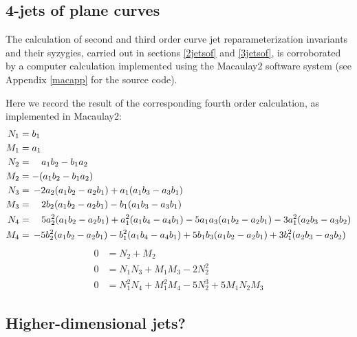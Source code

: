 \documentclass[12pt]{article}
\numberwithin{equation}{section}
\theoremstyle{plain}
\theoremstyle{definition}
\begin{document}
\subsection{4-jets of plane curves}

The calculation of second and third order curve jet reparameterization invariants and their syzygies, carried out in sections \ref{2jetsof} and \ref{3jetsof}, is corroborated by a computer calculation implemented using the Macaulay2 software system (see Appendix \ref{macapp} for the source code).

Here we record the result of the corresponding fourth order calculation, as implemented in Macaulay2:
\begin{align}\begin{split}\label{4sep}
N_1 &= b_{1}\\
M_1 &= a_{1}\\
N_2 &= \quad a_{1}b_{2}-b_{1}a_{2}\\
M_2 &= -(a_{1}b_{2}-b_{1}a_{2})\\
N_3 &= \thinspace -2a_2(a_{1}b_{2}-a_2b_{1}) +  a_{1}(a_{1}b_{3}-a_{3}b_{1}) \\
M_3 &= \quad       2b_2(a_{1}b_{2}-a_2b_{1}) -  b_{1}(a_{1}b_{3}-a_{3}b_{1})\\
N_4 &= \quad 5a_2^2(a_1b_2-a_2b_1) + a_1^2(a_1b_4-a_4b_1) - 5a_1a_3(a_1b_2-a_2b_1) - 3a_1^2(a_2b_3-a_3b_2)\\
M_4 &= \thinspace-5b_2^2(a_1b_2-a_2b_1) - b_1^2(a_1b_4-a_4b_1) + 5b_1b_3(a_1b_2-a_2b_1) + 3b_1^2(a_2b_3-a_3b_2)
\end{split}
\end{align}
\begin{align*}
0&= N_2+M_2\\
0&= N_1N_3+M_1M_3-2N_2^2\\
0&= N_1^2N_4+M_1^2M_4 - 5 N_2^3 + 5M_1N_2M_3
\end{align*}


\subsection{Higher-dimensional jets?}\label{hdjets}
\end{document}
